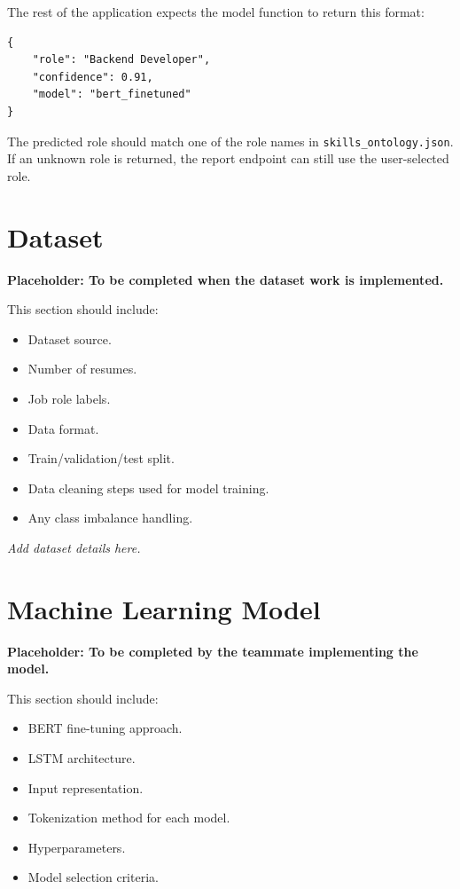 \documentclass[12pt,a4paper]{article}
\begin{document}
The rest of the application expects the model function to return this format:

\begin{lstlisting}
{
    "role": "Backend Developer",
    "confidence": 0.91,
    "model": "bert_finetuned"
}
\end{lstlisting}

The predicted role should match one of the role names in \texttt{skills\_ontology.json}. If an unknown role is returned, the report endpoint can still use the user-selected role.

\section{Dataset}

\textbf{Placeholder: To be completed when the dataset work is implemented.}

This section should include:

\begin{itemize}
    \item Dataset source.
    \item Number of resumes.
    \item Job role labels.
    \item Data format.
    \item Train/validation/test split.
    \item Data cleaning steps used for model training.
    \item Any class imbalance handling.
\end{itemize}

\vspace{2cm}
\noindent\textit{Add dataset details here.}

\section{Machine Learning Model}

\textbf{Placeholder: To be completed by the teammate implementing the model.}

This section should include:

\begin{itemize}
    \item BERT fine-tuning approach.
    \item LSTM architecture.
    \item Input representation.
    \item Tokenization method for each model.
    \item Hyperparameters.
    \item Model selection criteria.
\end{itemize}
\end{document}
